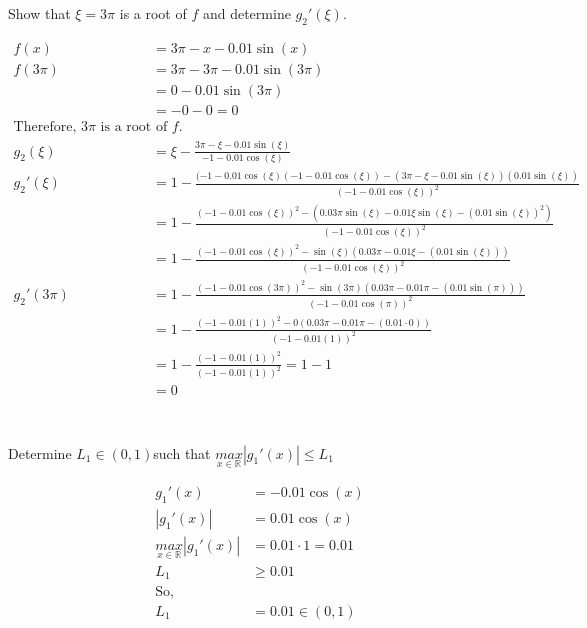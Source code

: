 \documentclass{article}
\begin{document}
\section{}
Show that $\xi = 3\pi$ is a root of $f$ and determine $g_2'(\xi)$.
\vspace{10mm}

\begin{align*}
    f(x) &= 3\pi - x - 0.01 \sin(x)\\
    f(3\pi) &= 3\pi - 3\pi - 0.01 \sin(3\pi)\\
    &= 0 - 0.01 \sin(3\pi)\\
    &=- 0-0 = 0\\
    \text{Therefore, $3\pi$ is a root of $f$.}&\\
    g_2(\xi) &= \xi - \frac{3\pi - \xi - 0.01\sin(\xi)}{-1-0.01\cos(\xi)}\\
    g_2'(\xi)&= 1 - \frac{(-1-0.01\cos(\xi)(-1-0.01\cos(\xi))-(3\pi - \xi - 0.01\sin(\xi))(0.01\sin(\xi))} {(-1-0.01\cos(\xi))^2}\\
    &= 1-\frac{(-1-0.01\cos(\xi))^2- (0.03\pi\sin(\xi)-0.01\xi\sin(\xi)- (0.01\sin(\xi))^2 )}{(-1-0.01\cos(\xi))^2}\\
    &=1- \frac{(-1-0.01\cos(\xi))^2- \sin(\xi)(0.03\pi-0.01\xi - (0.01\sin(\xi)) )}{(-1-0.01\cos(\xi))^2}\\
    g_2'(3\pi)&= 1- \frac{(-1-0.01\cos(3\pi))^2- \sin(3\pi)(0.03\pi-0.01\pi - (0.01\sin(\pi)) )}{(-1-0.01\cos(\pi))^2}\\
    &= 1- \frac{(-1-0.01(1))^2- 0(0.03\pi-0.01\pi - (0.01\cdot 0) )}{(-1-0.01(1))^2}\\
    &= 1- \frac{(-1-0.01(1))^2}{(-1-0.01(1))^2}= 1 - 1\\
    &= 0\\
\end{align*}


\section{}
Determine $L_1 \in (0,1)$such that $\underset{x \in \mathbb{R}}{max}|g_1'(x)|\le L_1$
\vspace{10mm}

\begin{align*}
    g_1'(x) &= -0.01\cos(x)\\
    |g_1'(x)| &= 0.01\cos(x)\\
    \underset{x \in \mathbb{R}}{max}|g_1'(x)| &= 0.01 \cdot 1 = 0.01\\
    L_1 &\ge 0.01\\
    \text{So,}&\\
    L_1 &= 0.01 \in (0,1)\\
\end{align*}
\end{document}
